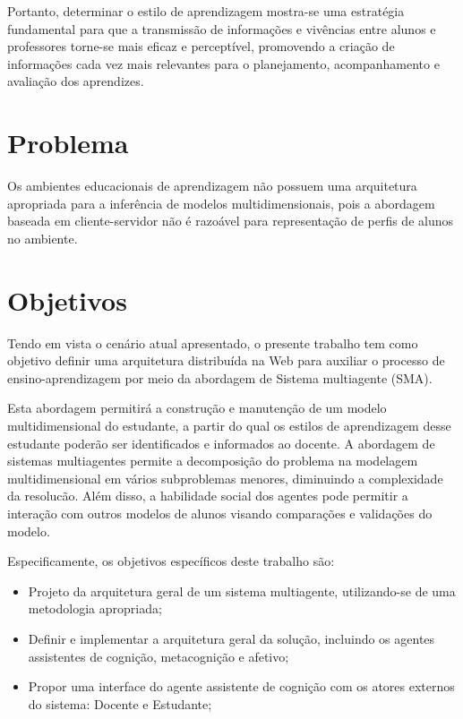 Portanto, determinar o estilo de aprendizagem mostra-se uma estratégia fundamental para que a transmissão de informações e vivências entre alunos e professores torne-se mais eficaz e perceptível, promovendo a criação de informações cada vez mais relevantes para o planejamento, acompanhamento e avaliação dos aprendizes.


\section{Problema}
Os ambientes educacionais de aprendizagem não possuem uma arquitetura apropriada para a inferência de modelos multidimensionais, pois a abordagem baseada em cliente-servidor não é razoável para representação de perfis de alunos no ambiente.

\section{Objetivos}
Tendo em vista o cenário atual apresentado, o presente trabalho tem como objetivo definir uma arquitetura distribuída na Web para auxiliar o processo de ensino-aprendizagem por meio da abordagem de Sistema multiagente (SMA).

Esta abordagem permitirá a construção e manutenção de um modelo multidimensional do estudante, a partir do qual os estilos de aprendizagem desse estudante poderão ser identificados e informados ao docente. A abordagem de sistemas multiagentes permite a decomposição do problema na modelagem multidimensional em vários subproblemas menores, diminuindo a complexidade da resolucão. Além disso, a habilidade social dos agentes pode permitir a interação com outros modelos de alunos visando comparações e validações do modelo.

Especificamente, os objetivos específicos deste trabalho são:
\begin{itemize}
 	\item Projeto da arquitetura geral de um sistema multiagente, utilizando-se de uma metodologia apropriada;
	\item Definir e implementar a arquitetura geral da solução, incluindo os agentes assistentes de cognição, metacognição e afetivo;
	\item Propor uma interface do agente assistente de cognição com os atores externos do sistema: Docente e Estudante;
\end{itemize}

